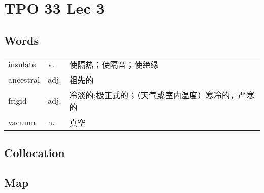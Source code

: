\section{TPO 33 Lec 3}

\subsection{Words}

\begin{tabular}{lll}
    insulate  & v.   & 使隔热；使隔音；使绝缘               \\
    ancestral & adj. & 祖先的                       \\
    frigid    & adj. & 冷淡的;极正式的；（天气或室内温度）寒冷的，严寒的 \\
    vacuum    & n.   & 真空                        \\
\end{tabular}

\subsection{Collocation}

\subsection{Map}
